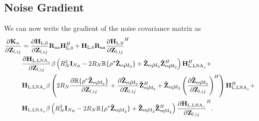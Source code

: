 \subsection{Noise Gradient}
We can now write the gradient of the noise covariance matrix as
\begin{align}
\label{eq:noise_grad}\nonumber
\frac{\partial\mat{K}_n}{\partial\mat{Z}_{l,ij}} &= 
\frac{\partial\mat{H}_\text{L,0}}{\partial\mat{Z}_{l,ij}}\mat{R}_\text{na}\mat{H}_\text{L,0}^H +\mat{H}_\text{L,0}\mat{R}_\text{na} \frac{\partial\mat{H}_\text{L,0}}{\partial\mat{Z}_{l,ij}}^H
\\\nonumber
&\frac{\partial\mat{H}_{\text{L,LNA}_v}}{\partial\mat{Z}_{l,ij}}\beta\left(R_N^2\mat{I}_{N_R} - 2 R_N\mathbb{R}\{\rho^*\mat{\tilde{Z}}_{\text{eqM}_2}\} + \mat{\tilde{Z}}_{\text{eqM}_2}\mat{\tilde{Z}}_{\text{eqM}_2}^H\right)\mat{H}_{\text{L,LNA}_v}^H+
\\\nonumber
&\mat{H}_{\text{L,LNA}_v}\beta\left(2 R_N\frac{\partial\mathbb{R}\{\rho^*\mat{\tilde{Z}}_{\text{eqM}_2}\}}{\partial\mat{Z}_{l,ij}} +
\frac{\partial\mat{\tilde{Z}}_{\text{eqM}_2}}{\partial\mat{Z}_{l,ij}}\mat{\tilde{Z}}_{\text{eqM}_2}^H + \mat{\tilde{Z}}_{\text{eqM}_2}\left(\frac{\partial\mat{\tilde{Z}}_{\text{eqM}_2}}{\partial\mat{Z}_{l,ij}}\right)^H\right)\mat{H}_{\text{L,LNA}_v}^H+\\
&\mat{H}_{\text{L,LNA}_v}\beta\left(R_N^2\mat{I}_{N_R} - 2 R_N\mathbb{R}\{\rho^*\mat{\tilde{Z}}_{\text{eqM}_2}\} + \mat{\tilde{Z}}_{\text{eqM}_2}\mat{\tilde{Z}}_{\text{eqM}_2}^H\right)\frac{\partial\mat{H}_{\text{L,LNA}_v}}{\partial\mat{Z}_{l,ij}}^H.%
\end{align}


